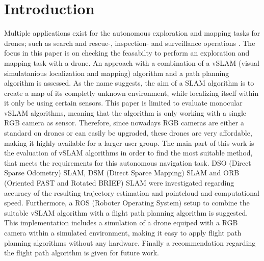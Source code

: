 \chapter{Introduction}

Multiple applications exist for the autonomous exploration and mapping tasks for drones;
 such as search and rescue-, inspection- and surveillance operations \cite{tasks}.
 The focus in this paper is on checking the feasabilty to perform an exploration and mapping task with a drone.
An approach with a combination of a vSLAM (visual simulatanious localization
and mapping) algorithm and a path planning algorithm is assessed. As the name 
suggests, the aim of a SLAM algorithm is to create a map of its completly
 unknown environment, while localizing itself within it only be using certain sensors.
 This paper is limited to evaluate monocular vSLAM algorithms, meaning that the algorithm is only working
 with a single RGB camera as sensor. Therefore, since nowadays RGB cameras are either a standard on drones or can easily be upgraded, these drones are very affordable, making it highly available for a larger user group.  
The main part of this work is the evaluation of vSLAM algorithms in order to find the 
most suitable method, that meets the requirements for this autonomous navigation task.
 DSO (Direct Sparse Odometry) SLAM, DSM (Direct Sparce Mapping) SLAM and ORB (Oriented FAST and Rotated BRIEF)
 SLAM were investigated regarding accuracy of the resulting trajectory estimation and pointcloud and computational speed. 
Furthermore, a ROS (Roboter Operating System) setup to combine the suitable vSLAM algorithm with a flight
 path planning algorithm is suggested. This implementation includes a simulation of a drone equiped with a RGB camera within a 
 simulated environment, making it easy to apply flight path planning algorithms without any hardware.
 Finally a recommendation regarding the flight path algorithm is given for future work.
 




